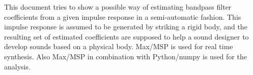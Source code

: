 \label{sec:zusammenfassung}
This document tries to show a possible way of estimating bandpass filter coefficients from a given impulse response in a semi-automatic fashion. This impulse response is assumed to be generated by striking a rigid body, and the resulting set of estimated coefficients are supposed to help a sound designer to develop sounds based on a physical body. Max/MSP is used for real time synthesis. Also Max/MSP in combination with Python/numpy is used for the analysis.

